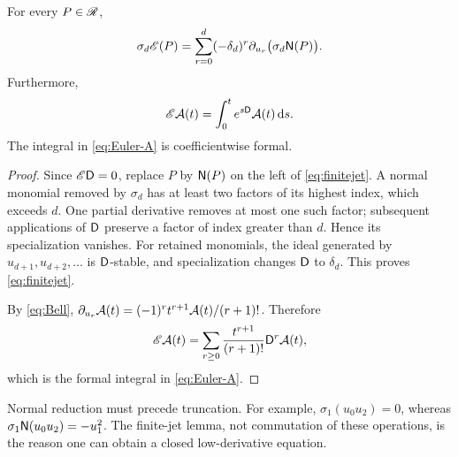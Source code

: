 \begin{lemma}\label{lem:finitejet}
For every $P\in\mathscr R$,
\begin{equation}\label{eq:finitejet}
 \sigma_d\mathscr E(P)=
 \sum_{r=0}^d(-\delta_d)^r\partial_{u_r}\bigl(\sigma_d\mathsf N(P)\bigr).
\end{equation}
Furthermore,
\begin{equation}\label{eq:Euler-A}
 \mathscr E\mathcal A(t)=\int_0^t e^{s\mathsf D}\mathcal A(t)\,\mathrm d s.
\end{equation}
The integral in \eqref{eq:Euler-A} is coefficientwise formal.
\end{lemma}
\begin{proof}
Since $\mathscr E\mathsf D=0$, replace $P$ by $\mathsf N(P)$ on the left of
\eqref{eq:finitejet}. A normal monomial removed by $\sigma_d$ has at
least two factors of its highest index, which exceeds $d$. One partial
derivative removes at most one such factor; subsequent applications of
$\mathsf D$ preserve a factor of index greater than $d$. Hence its specialization
vanishes. For retained monomials, the ideal generated by
$u_{d+1},u_{d+2},\ldots$ is $\mathsf D$-stable, and specialization changes
$\mathsf D$ to $\delta_d$. This proves \eqref{eq:finitejet}.

By \eqref{eq:Bell},
$\partial_{u_r}\mathcal A(t)=(-1)^rt^{r+1}\mathcal A(t)/(r+1)!$. Therefore
\[
 \mathscr E\mathcal A(t)=\sum_{r\ge0}\frac{t^{r+1}}{(r+1)!}\mathsf D^r\mathcal A(t),
\]
which is the formal integral in \eqref{eq:Euler-A}.
\end{proof}

Normal reduction must precede truncation. For example,
$\sigma_1(u_0u_2)=0$, whereas
$\sigma_1\mathsf N(u_0u_2)=-u_1^2$.
The finite-jet lemma, not commutation of these operations, is the reason
one can obtain a closed low-derivative equation.
